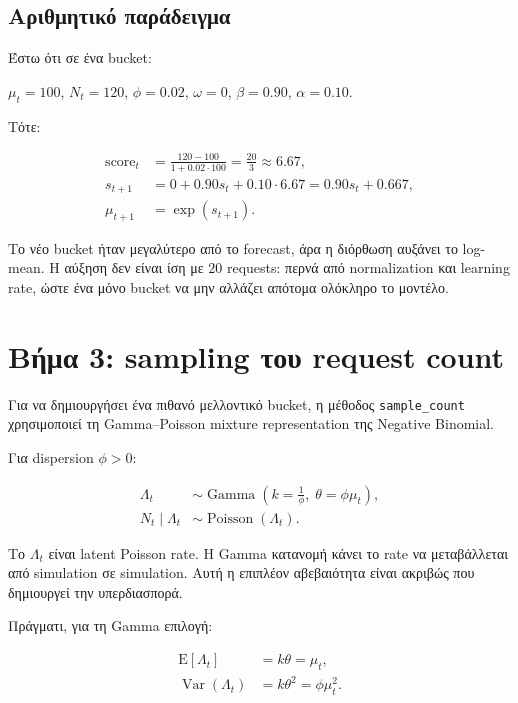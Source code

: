 \documentclass[11pt,a4paper]{article}
\newcommand{\code}[1]{\texttt{#1}}
\begin{document}
\subsection{Αριθμητικό παράδειγμα}

Έστω ότι σε ένα bucket:

\begin{center}
  $\mu_t=100$, $N_t=120$, $\phi=0.02$, $\omega=0$,
  $\beta=0.90$, $\alpha=0.10$.
\end{center}

Τότε:

\begin{align*}
  \text{score}_t
    &= \frac{120-100}{1+0.02\cdot100}
     = \frac{20}{3}
     \approx 6.67,\\
  s_{t+1}
    &= 0 + 0.90s_t + 0.10\cdot6.67
     = 0.90s_t + 0.667,\\
  \mu_{t+1}
    &= \exp(s_{t+1}).
\end{align*}

Το νέο bucket ήταν μεγαλύτερο από το forecast, άρα η διόρθωση αυξάνει το
log-mean. Η αύξηση δεν είναι ίση με $20$ requests: περνά από normalization
και learning rate, ώστε ένα μόνο bucket να μην αλλάζει απότομα ολόκληρο το
μοντέλο.

\section{Βήμα 3: sampling του request count}

Για να δημιουργήσει ένα πιθανό μελλοντικό bucket, η μέθοδος
\code{sample\_count} χρησιμοποιεί τη Gamma--Poisson mixture representation
της Negative Binomial.

Για dispersion $\phi>0$:

\begin{align*}
  \Lambda_t &\sim \operatorname{Gamma}
    \left(k=\frac{1}{\phi},\;\theta=\phi\mu_t\right),\\
  N_t\mid\Lambda_t &\sim \operatorname{Poisson}(\Lambda_t).
\end{align*}

Το $\Lambda_t$ είναι latent Poisson rate. Η Gamma κατανομή κάνει το rate να
μεταβάλλεται από simulation σε simulation. Αυτή η επιπλέον αβεβαιότητα είναι
ακριβώς που δημιουργεί την υπερδιασπορά.

Πράγματι, για τη Gamma επιλογή:

\begin{align*}
  \mathrm{E}[\Lambda_t] &= k\theta = \mu_t,\\
  \operatorname{Var}(\Lambda_t) &= k\theta^2 = \phi\mu_t^2.
\end{align*}
\end{document}
